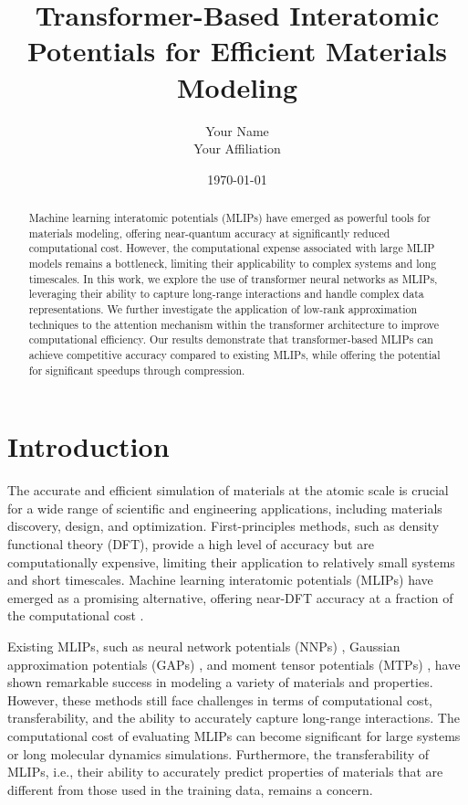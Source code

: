 \documentclass{article}
\title{Transformer-Based Interatomic Potentials for Efficient Materials Modeling}
\author{Your Name \\ Your Affiliation}
\date{\today}
\begin{document}
\maketitle

\begin{abstract}
Machine learning interatomic potentials (MLIPs) have emerged as powerful tools for materials modeling, offering near-quantum accuracy at significantly reduced computational cost. However, the computational expense associated with large MLIP models remains a bottleneck, limiting their applicability to complex systems and long timescales. In this work, we explore the use of transformer neural networks as MLIPs, leveraging their ability to capture long-range interactions and handle complex data representations. We further investigate the application of low-rank approximation techniques to the attention mechanism within the transformer architecture to improve computational efficiency. Our results demonstrate that transformer-based MLIPs can achieve competitive accuracy compared to existing MLIPs, while offering the potential for significant speedups through compression.
\end{abstract}

\section{Introduction}

The accurate and efficient simulation of materials at the atomic scale is crucial for a wide range of scientific and engineering applications, including materials discovery, design, and optimization. First-principles methods, such as density functional theory (DFT), provide a high level of accuracy but are computationally expensive, limiting their application to relatively small systems and short timescales. Machine learning interatomic potentials (MLIPs) have emerged as a promising alternative, offering near-DFT accuracy at a fraction of the computational cost \cite{behler2007generalized, bartok2010gaussian, shapeev2016moment}.

Existing MLIPs, such as neural network potentials (NNPs) \cite{behler2007generalized}, Gaussian approximation potentials (GAPs) \cite{bartok2010gaussian}, and moment tensor potentials (MTPs) \cite{shapeev2016moment}, have shown remarkable success in modeling a variety of materials and properties. However, these methods still face challenges in terms of computational cost, transferability, and the ability to accurately capture long-range interactions. The computational cost of evaluating MLIPs can become significant for large systems or long molecular dynamics simulations. Furthermore, the transferability of MLIPs, i.e., their ability to accurately predict properties of materials that are different from those used in the training data, remains a concern.
\end{document}

